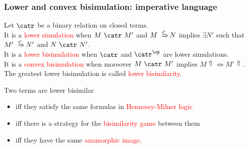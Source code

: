 \documentclass{beamer}
\newcommand{\medsquig}[1]{\ \Rightarrow^{\hspace{-0.9em}\raisebox{0.3ex}{${#1}$}}\ }
\newcommand{\red}[1]{\textcolor{red}{#1}}
\begin{document}
\begin{frame}\frametitle{Lower and convex bisimulation: imperative language}
  
Let $\catr$ be a binary relation on closed terms.  \\
\medskip
It is a \red{lower simulation} when $M \ \catr \ M'$ and $M \medsquig{c} N$ implies $\exists N'$ such that $M' \medsquig{c} N'$ and $N \ \catr \ N'$. \\
\medskip
It is a \red{lower bisimulation} when $\catr$ and $\catr^{\op}$ are lower simulations. \\
\medskip
It is a \red{convex bisimulation} when moreover $M\ \catr\ M'$ implies $M \Uparrow \Leftrightarrow M' \Uparrow$.  \\
\medskip
The greatest lower bisimulation is called \red{lower bisimilarity}.

\medskip \pause
Two terms are lower bisimilar 
\begin{itemize}
\pause\item iff they satisfy the same formulas in \red{Hennessy-Milner logic}
\pause\item iff there is a strategy for the \red{bisimilarity game} between them
\pause \item iff they have the same \red{anamorphic image}.
\end{itemize}
\end{frame}
\end{document}
